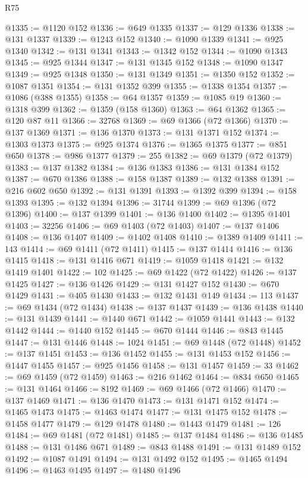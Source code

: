 \begin{lexlean}{R75}
\begin{coremodule}
@1335 := @1120 @152
@1336 := @649 @1335
@1337 := @129 @1336
@1338 := @131 @1337
@1339 := @1243 @152
@1340 := @1090 @1339
@1341 := @925 @1340
@1342 := @131 @1341
@1343 := @1342 @152
@1344 := @1090 @1343
@1345 := @925 @1344
@1347 := @131 @1345 @152
@1348 := @1090 @1347
@1349 := @925 @1348
@1350 := @131 @1349
@1351 := @1350 @152
@1352 := @1087 @1351
@1354 := @131 @1352 @399
@1355 := @1338 @1354
@1357 := @1086 (@388 @1355)
@1358 := @64 @1357
@1359 := @1085 @19
@1360 := @1318 @399
@1362 := @1359 (@158 @1360)
@1363 := @64 @1362
@1365 := @120 @87 @11
@1366 := 32768
@1369 := @69 @1366 (@72 @1366)
@1370 := @137 @1369
@1371 := @136 @1370
@1373 := @131 @1371 @152
@1374 := @1303 @1373
@1375 := @925 @1374
@1376 := @1365 @1375
@1377 := @851 @650
@1378 := @986 @1377
@1379 := 255
@1382 := @69 @1379 (@72 @1379)
@1383 := @137 @1382
@1384 := @136 @1383
@1386 := @131 @1384 @152
@1387 := @670 @1386
@1388 := @158 @1387
@1389 := @132 @1388
@1391 := @216 @602 @650
@1392 := @131 @1391
@1393 := @1392 @399
@1394 := @158 @1393
@1395 := @132 @1394
@1396 := 31744
@1399 := @69 @1396 (@72 @1396)
@1400 := @137 @1399
@1401 := @136 @1400
@1402 := @1395 @1401
@1403 := 32256
@1406 := @69 @1403 (@72 @1403)
@1407 := @137 @1406
@1408 := @136 @1407
@1409 := @1402 @1408
@1410 := @1389 @1409
@1411 := 143
@1414 := @69 @1411 (@72 @1411)
@1415 := @137 @1414
@1416 := @136 @1415
@1418 := @131 @1416 @671
@1419 := @1059 @1418
@1421 := @132 @1419 @1401
@1422 := 102
@1425 := @69 @1422 (@72 @1422)
@1426 := @137 @1425
@1427 := @136 @1426
@1429 := @131 @1427 @152
@1430 := @670 @1429
@1431 := @405 @1430
@1433 := @132 @1431 @149
@1434 := 113
@1437 := @69 @1434 (@72 @1434)
@1438 := @137 @1437
@1439 := @136 @1438
@1440 := @131 @1439
@1441 := @1440 @671
@1442 := @1059 @1441
@1443 := @132 @1442
@1444 := @1440 @152
@1445 := @670 @1444
@1446 := @843 @1445
@1447 := @131 @1446
@1448 := 1024
@1451 := @69 @1448 (@72 @1448)
@1452 := @137 @1451
@1453 := @136 @1452
@1455 := @131 @1453 @152
@1456 := @1447 @1455
@1457 := @925 @1456
@1458 := @131 @1457
@1459 := 33
@1462 := @69 @1459 (@72 @1459)
@1463 := @216 @1462
@1464 := @834 @650
@1465 := @131 @1464
@1466 := 8192
@1469 := @69 @1466 (@72 @1466)
@1470 := @137 @1469
@1471 := @136 @1470
@1473 := @131 @1471 @152
@1474 := @1465 @1473
@1475 := @1463 @1474
@1477 := @131 @1475 @152
@1478 := @1458 @1477
@1479 := @129 @1478
@1480 := @1443 @1479
@1481 := 126
@1484 := @69 @1481 (@72 @1481)
@1485 := @137 @1484
@1486 := @136 @1485
@1488 := @131 @1486 @671
@1489 := @843 @1488
@1491 := @131 @1489 @152
@1492 := @1087 @1491
@1494 := @131 @1492 @152
@1495 := @1465 @1494
@1496 := @1463 @1495
@1497 := @1480 @1496

\end{coremodule}
\end{lexlean}
